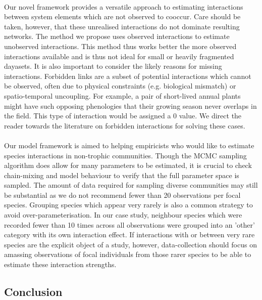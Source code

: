 \documentclass[a4,12pt]{article}
\begin{document}
        \paragraph{}
        Our novel framework provides a versatile approach to estimating interactions between system elements which are not observed to cooccur. Care should be taken, however, that these unrealised interactions do not dominate resulting networks. The method we propose uses observed interactions to estimate unobserved interactions. This method thus works better the more observed interactions available and is thus not ideal for small or heavily fragmented dayasets. It is also important to consider the likely reasons for missing interactions. Forbidden links are a subset of potential interactions which cannot be observed, often due to physical constraints (e.g. biological mismatch) or spatio-temporal uncoupling. For example, a pair of short-lived annual plants might have such opposing phenologies that their growing season never overlaps in the field. This type of interaction would be assigned a 0 value. We direct the reader towards the literature on forbidden interactions \parencite{Olesen2011, Jordano2016} for solving these cases. 

        \paragraph{}
        Our model framework is aimed to helping empiricists who would like to estimate species interactions in non-trophic communities. Though the MCMC sampling algorithm does allow for many parameters to be estimated, it is crucial to check chain-mixing and model behaviour to verify that the full parameter space is sampled. The amount of data required for sampling diverse communities may still be substantial as we do not recommend fewer than 20 observations per focal species. Grouping species which appear very rarely is also a common strategy to avoid over-parameterisation. In our case study, neighbour species which were recorded fewer than 10 times across all observations were grouped into an 'other' category with its own interaction effect. If interactions with or between very rare species are the explicit object of a study, however, data-collection should focus on amassing observations of focal individuals from those rarer species to be able to estimate these interaction strengths.   

\subsection{Conclusion}
\end{document}
